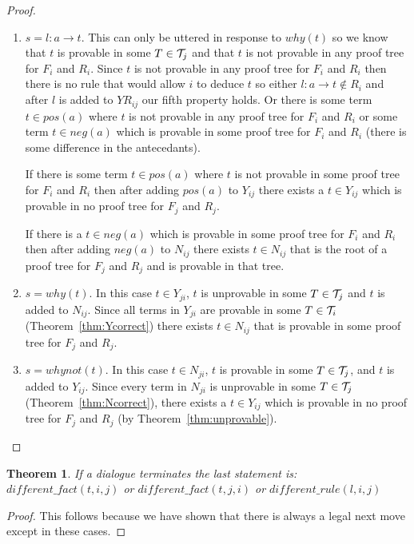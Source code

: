 \documentclass{blue-book}
\newtheorem{theorem}{Theorem}
\newcommand{\drule}[3]{\ensuremath{#1:#2 \rightarrow #3}}
\begin{document}
\begin{proof}
\begin{enumerate}
\item $s = \drule{l}{a}{t}$.  This can only be uttered in response to $why(t)$ so we know that  $t$ is provable in some $T \in {\cal T}_j$ and that $t$ is not provable in any proof tree for $F_i$ and $R_i$.  Since $t$ is not provable in any proof tree for $F_i$ and $R_i$ then there is no rule that would allow $i$ to deduce $t$ so either $\drule{l}{a}{t} \not\in R_i$ and after $l$ is added to $YR_{ij}$ our fifth property holds.  Or there is some term $t \in pos(a)$ where $t$ is not provable in any proof tree for $F_i$ and $R_i$ or some term  $t \in neg(a)$ which is provable in some proof tree for $F_i$ and $R_i$ (there is some difference in the antecedants).  

If there is some term $t \in pos(a)$ where $t$ is not provable in some proof tree for $F_i$ and $R_i$ then after adding $pos(a)$ to $Y_{ij}$ there exists a $t \in Y_{ij}$ which is provable in no proof tree for $F_j$ and $R_j$.
 
 If  there is a $t \in neg(a)$ which is provable in some proof tree for $F_i$ and $R_i$ then after adding $neg(a)$ to $N_{ij}$ there exists $t \in N_{ij}$ that is the root of a proof tree for $F_j$ and $R_j$ and is provable in that tree.
 
\item $s = why(t)$.  In this case $t \in Y_{ji}$, $t$ is unprovable in some $T \in {\cal T}_j$ and $t$ is added to $N_{ij}$. Since all terms in $Y_{ji}$ are provable in some $T \in {\cal T}_i$ (Theorem~\ref{thm:Ycorrect}) there exists $t \in N_{ij}$ that is provable in some proof tree for $F_j$ and $R_j$.

\item $s = whynot(t)$.  In this case $t \in N_{ji}$, $t$ is provable in some $T \in {\cal T}_j$, and $t$ is added to $Y_{ij}$. Since every term in $N_{ji}$ is unprovable in some $T \in {\cal T}_j$ (Theorem~\ref{thm:Ncorrect}), there exists a $t \in Y_{ij}$ which is provable in no proof tree for $F_j$ and $R_j$ (by Theorem~\ref{thm:unprovable}).
\end{enumerate}
\end{proof}

\begin{sloppypar}
\begin{theorem}
If a dialogue terminates the last statement is: $\mathit{different\_fact}(t, i, j)$ or $\mathit{different\_fact}(t, j, i)$ or $\mathit{different\_rule(l, i, j)}$
\end{theorem}
\end{sloppypar}
\begin{proof}This follows because we have shown that there is always a legal next move except in these cases.
\end{proof}



\end{document}

